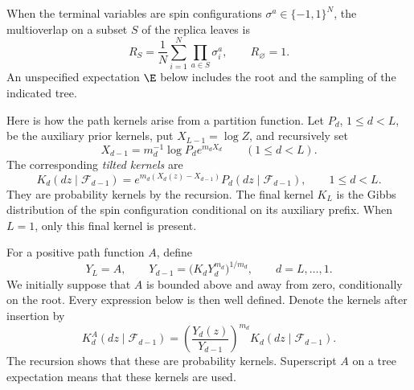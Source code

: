 When the terminal variables are spin configurations
$\sigma^a\in\{-1,1\}^N$, the multioverlap on a subset $S$ of the
replica leaves is
\begin{equation}\label{tree:multioverlap}
 R_S=\frac1N\sum_{i=1}^N\prod_{a\in S}\sigma_i^a,
 \qquad R_\varnothing=1.
\end{equation}
An unspecified expectation $\E$ below includes the root and the
sampling of the indicated tree.

Here is how the path kernels arise from a partition function. Let
$P_d$, $1\le d<L$, be the auxiliary prior kernels, put
$X_{L-1}=\log Z$, and recursively set
\[
 X_{d-1}=m_d^{-1}\log P_d e^{m_dX_d}\qquad(1\le d<L).
\]
The corresponding \emph{tilted kernels} are
\begin{equation}\label{tree:original-tilt}
 K_d(dz\mid\mathscr F_{d-1})
 =e^{m_d(X_d(z)-X_{d-1})}P_d(dz\mid\mathscr F_{d-1}),
 \qquad 1\le d<L.
\end{equation}
They are probability kernels by the recursion. The final kernel $K_L$
is the Gibbs distribution of the spin configuration conditional on its
auxiliary prefix. When $L=1$, only this final kernel is present.

For a positive path function $A$, define
\begin{equation}\label{tree:Y-recursion}
  Y_L=A,\qquad
  Y_{d-1}=\bigl(K_dY_d^{m_d}\bigr)^{1/m_d},
  \qquad d=L,\ldots,1.
\end{equation}
We initially suppose that $A$ is bounded above and away from zero,
conditionally on the root.  Every expression below is then well
defined.  Denote the kernels after insertion by
\begin{equation}\label{tree:updated-kernel}
  K_d^A(dz\mid\mathscr F_{d-1})
  =\left(\frac{Y_d(z)}{Y_{d-1}}\right)^{m_d}
     K_d(dz\mid\mathscr F_{d-1}).
\end{equation}
The recursion shows that these are probability kernels.  Superscript
$A$ on a tree expectation means that these kernels are used.

